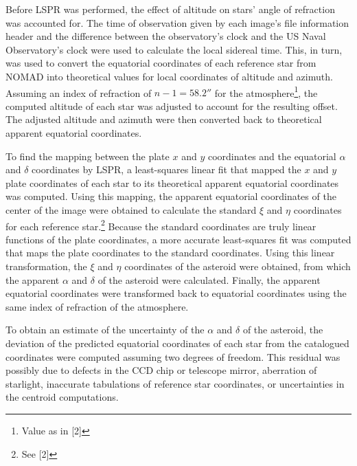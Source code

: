 \documentclass[12pt,journal,compsoc]{IEEEtran}
\begin{document}
Before LSPR was performed, the effect of altitude on stars' angle of refraction was accounted for. 
The time of observation given by each image's file information header and the difference between the 
observatory's clock and the US Naval Observatory's clock were used to calculate the local sidereal time.
This, in turn, was used to convert the equatorial coordinates of each reference star from NOMAD 
into theoretical values for local coordinates of altitude and azimuth.
Assuming an index of refraction of $n-1=58.2''$ for the atmosphere\footnote{Value as in [2]}, 
the computed altitude of each star was adjusted to account for the resulting offset.
The adjusted altitude and azimuth were then converted back to theoretical apparent equatorial coordinates.

To find the mapping between the plate $x$ and $y$ coordinates and the equatorial $\alpha$ and $\delta$ coordinates by LSPR, 
a least-squares linear fit that mapped the $x$ and $y$ plate coordinates of each star to its 
theoretical apparent equatorial coordinates was computed.
Using this mapping, the apparent equatorial coordinates of the center of the image were obtained 
to calculate the standard $\xi$ and $\eta$ coordinates for each reference star.\footnote{See [2]} 
Because the standard coordinates are truly linear functions of the plate coordinates, 
a more accurate least-squares fit was computed that maps the plate coordinates to the standard coordinates.
Using this linear transformation, the $\xi$ and $\eta$ coordinates of the asteroid were obtained, 
from which the apparent $\alpha$ and $\delta$ of the asteroid were calculated.
Finally, the apparent equatorial coordinates were transformed back to equatorial coordinates 
using the same index of refraction of the atmosphere.

To obtain an estimate of the uncertainty of the $\alpha$ and $\delta$ of the asteroid, 
the deviation of the predicted equatorial coordinates of each star 
from the catalogued coordinates were computed assuming two degrees of freedom.
This residual was possibly due to defects in the CCD chip or telescope mirror, 
aberration of starlight, inaccurate tabulations of reference star coordinates, 
or uncertainties in the centroid computations.
\end{document}
